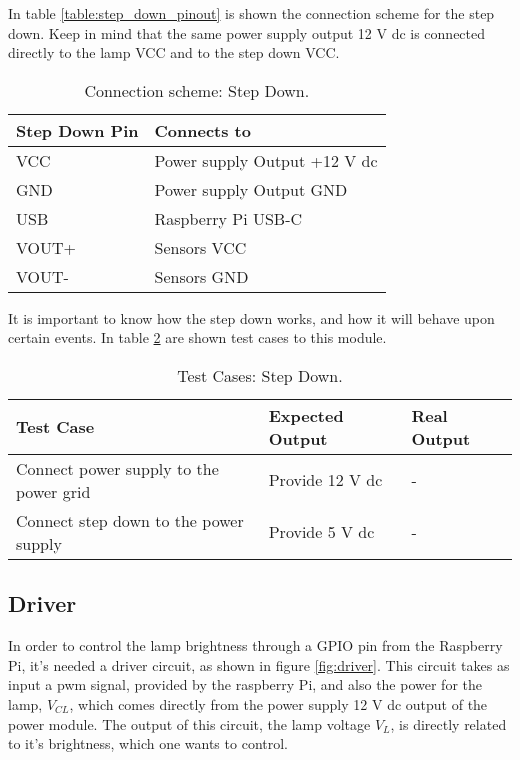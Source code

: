 In table \ref{table:step_down_pinout} is shown the connection scheme for the step down. Keep in mind that the same power supply output 12 V \ac{dc} is connected directly to the lamp VCC and to the step down VCC.

\begin{table}[H]
	\centering
	\begin{tabular}{|m{5cm}|m{6cm}|}
		\hline
		\textbf{Step Down Pin} & \textbf{Connects to}
		\\\hline\hline
		
		VCC & Power supply Output +12 V \ac{dc}
		\\\hline
		GND & Power supply Output GND
		\\\hline
		USB & Raspberry Pi USB-C
		\\\hline
		VOUT+ & Sensors VCC
		\\\hline
		VOUT- & Sensors GND
		\\\hline
	\end{tabular}
	
	\caption{Connection scheme: Step Down.}
	\label{table:connect_power}
\end{table}

It is important to know how the step down works, and how it will behave upon certain events. In table \ref{table:test_step_down} are shown test cases to this module.

\begin{table}[H]
	\centering
	\resizebox{\columnwidth}{!}
	{
		\begin{tabular}{|m{3cm}|m{5cm}||m{5cm}|}
			\hline
			\textbf{Test Case} & \textbf{Expected Output} & \textbf{Real Output}
			\\\hline\hline
			Connect power supply to the power grid & Provide 12 V \ac{dc} & -
			\\\hline
			Connect step down to the power supply & Provide 5 V \ac{dc} & -
			\\\hline
		\end{tabular}
	}
	\caption{Test Cases: Step Down.}
	\label{table:test_step_down}
\end{table}
\subsection{Driver}
\label{subsection:driver}
In order to control the lamp brightness through a GPIO pin from the Raspberry Pi, it's needed a driver circuit, as shown in figure \ref{fig:driver}. This circuit takes as input a \ac{pwm} signal, provided by the raspberry Pi, and also the power for the lamp, \(V_{CL}\), which comes directly from the power supply 12 V \ac{dc} output of the power module. The output of this circuit, the lamp voltage \(V_{L}\), is directly related to it's brightness, which one wants to control.

